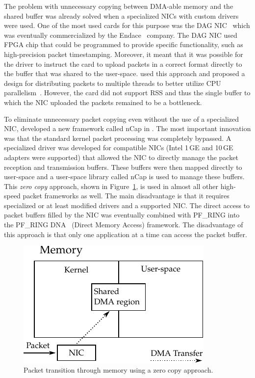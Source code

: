 The problem with unnecessary copying between DMA-able memory and the shared buffer was already solved when a specialized NICs with custom drivers were used. One of the most used cards for this purpose was the DAG NIC~\cite{UniversityWaikato--Dag} which was eventually commercialized by the Endace~\cite{ETL--Endace} company. The DAG NIC used FPGA chip that could be programmed to provide specific functionality, such as high-precision packet timestamping. Moreover, it meant that it was possible for the driver to instruct the card to upload packets in a correct format directly to the buffer that was shared to the user-space. \citeauthor{Degioanni-2004-Introducing} used this approach and proposed a design for distributing packets to multiple threads to better utilize CPU parallelism~\cite{Degioanni-2004-Introducing}. However, the card did not support RSS and thus the single buffer to which the NIC uploaded the packets remained to be a bottleneck.

To eliminate unnecessary packet copying even without the use of a specialized NIC, \citeauthor{Deri-2005-nCap} developed a new framework called nCap in \citeyear{Deri-2005-nCap}. The most important innovation was that the standard kernel packet processing was completely bypassed. A specialized driver was developed for compatible NICs (Intel 1\,GE and 10\,GE adapters were supported) that allowed the NIC to directly manage the packet reception and transmission buffers. These buffers were then mapped directly to user-space and a user-space library called nCap is used to manage these buffers. This \emph{zero copy} approach, shown in Figure~\ref{fig:zero_copy}, is used in almost all other high-speed packet frameworks as well. The main disadvantage is that it requires specialized or at least modified drivers and a supported NIC. The direct access to packet buffers filled by the NIC was eventually combined with PF\_RING into the PF\_RING DNA~\cite{ntop-2010-PFRING} (Direct Memory Access) framework. The disadvantage of this approach is that only one application at a time can access the packet buffer.

\begin{figure}[!tb]
  \begin{center}
    \includegraphics{figures/c05/zero_copy}
  \end{center}
  \caption{Packet transition through memory using a zero copy approach.}
  \label{fig:zero_copy}
\end{figure}

